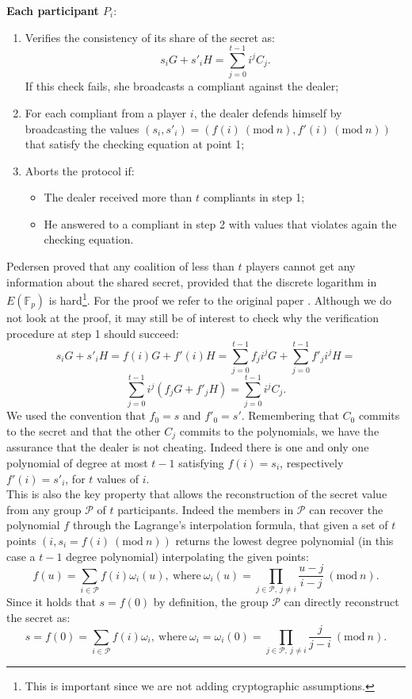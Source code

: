 \noindent
{\bf Each participant $P_i$}:
\begin{enumerate}
	\item Verifies the consistency of its share of the secret as:
	$$s_iG + s'_iH = \sum_{j = 0}^{t - 1}i^jC_j.$$
	If this check fails, she broadcasts a compliant against the dealer;
	\item For each compliant from a player $i$, the dealer defends himself by broadcasting the values $(s_i, s'_i) = (f(i) \ (\text{mod} \ n), f'(i) \ (\text{mod} \ n))$ that satisfy the checking equation at point 1;
	\item Aborts the protocol if:
	\begin{itemize}
		\item The dealer received more than $t$ compliants in step 1;
		\item He answered to a compliant in step 2 with values that violates again the checking equation.
	\end{itemize}
\end{enumerate}
Pedersen proved that any coalition of less than $t$ players cannot get any information about the shared secret, provided that the discrete logarithm in $E(\mathbb{F}_p)$ is hard\footnote{This is important since we are not adding cryptographic assumptions.}. For the proof we refer to the original paper \cite{RefWork:13}. Although we do not look at the proof, it may still be of interest to check why the verification procedure at step 1 should succeed:
$$s_iG+ s'_iH = f(i)G + f'(i)H = \sum_{j = 0}^{t- 1}f_ji^jG + \sum_{j = 0}^{t - 1}f'_ji^jH =$$
$$ \sum_{j = 0}^{t - 1}i^j(f_jG + f'_jH)= \sum_{j = 0}^{t - 1}i^jC_j.$$
We used the convention that $f_0 = s$ and $f'_0 = s'$. Remembering that $C_0$ commits to the secret and that the other $C_j$ commits to the polynomials, we have the assurance that the dealer is not cheating. Indeed there is one and only one polynomial of degree at most $t - 1$ satisfying $f(i) = s_i$, respectively $f'(i) = s'_i$, for $t$ values of $i$. 
\\
This is also the key property that allows the reconstruction of the secret value from any group $\mathcal{P}$ of $t$ participants. Indeed the members in $\mathcal{P}$ can recover the polynomial $f$ through the Lagrange's interpolation formula, that given a set of $t$ points $(i, s_i = f(i) \ (\text{mod} \ n))$ returns the lowest degree polynomial (in this case a $t - 1$ degree polynomial) interpolating the given points:
$$f(u) = \sum_{i \in \mathcal{P}}f(i)\omega_i(u), \ \text{where} \ \omega_i(u) = \prod_{j \in \mathcal{P}, \ j \neq i}\frac{u - j}{i - j} \ (\text{mod} \ n).$$
Since it holds that $s = f(0)$ by definition, the group $\mathcal{P}$ can directly reconstruct the secret as:
$$s = f(0) = \sum_{i \in \mathcal{P}}f(i)\omega_i,  \ \text{where} \ \omega_i = \omega_i(0) = \prod_{j \in \mathcal{P}, \ j \neq i}\frac{j}{j - i} \ (\text{mod} \ n).$$

